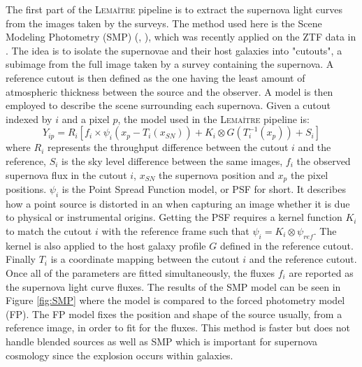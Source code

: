 The first part of the \textsc{Lemaître} pipeline is to extract the supernova light curves from the images taken by the surveys. The method used here is the Scene Modeling Photometry (SMP) (\cite{Astier_2013}, \cite{Holtzman_2008}), 
which was recently applied on the ZTF data in \cite{Lacroix_2025}. The idea is to isolate the supernovae and their host galaxies into "cutouts", a subimage from the full image 
taken by a survey containing the supernova. A reference cutout is then defined as the one having the least amount of atmospheric thickness between the source and the observer. 
A model is then employed to describe the scene surrounding each supernova. Given a cutout indexed by $i$ and a pixel $p$, the model used in the \textsc{Lemaître} pipeline is:
\begin{equation}
    Y_{ip} = R_i \left[ f_i \times \psi_i \left(x_p -  T_i(x_{SN})\right) + K_i \otimes G \left( T_i^{-1} (x_p)\right) + S_i  \right]
\end{equation}
where $R_i$ represents the throughput difference between the cutout $i$ and the reference, $S_i$ is the sky level difference between the same images, $f_i$ the observed supernova 
flux in the cutout $i$, $x_{SN}$ the supernova position and $x_p$ the pixel positions. $\psi_i$ is the Point Spread Function model, or PSF for short. It describes how a point source is distorted in an when capturing an image whether it is 
due to physical or instrumental origins. Getting the PSF requires a kernel function $K_i$ to match the cutout $i$ with the reference frame such that $\psi_i = K_i \otimes \psi_{ref}$. The 
kernel is also applied to the host galaxy profile $G$ defined in the reference cutout. Finally $T_i$ is a coordinate mapping between the cutout $i$ and the reference cutout. Once all 
of the parameters are fitted simultaneously, the fluxes $f_i$ are reported as the supernova light curve fluxes. The results of the SMP model can be seen in Figure 
\ref{fig:SMP} where the model is compared to the forced photometry model (FP). The FP model fixes the position and shape of the source usually, from a reference image, in order 
to fit for the fluxes. This method is faster but does not handle blended sources as well as SMP which is important for supernova cosmology since the explosion occurs within 
galaxies.  \\

